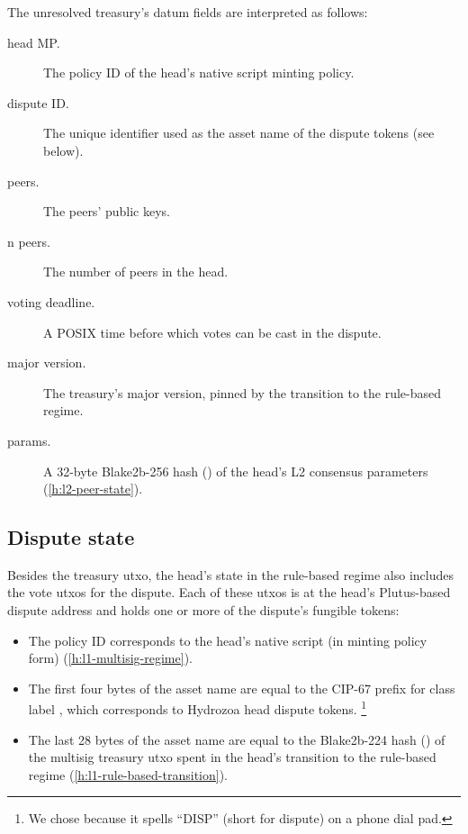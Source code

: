 \documentclass[../hydrozoa.tex]{subfiles}
\begin{document}
The unresolved treasury's datum fields are interpreted as follows:
\begin{description}
  \item[head MP.] The policy ID of the head's native script minting policy.
  \item[dispute ID.] The unique identifier used as the asset name of the dispute tokens (see below).
  \item[peers.] The peers' public keys.
  \item[n peers.] The number of peers in the head.
  \item[voting deadline.] A POSIX time before which votes can be cast in the dispute.
  \item[major version.] The treasury's major version, pinned by the transition to the rule-based regime.
  \item[params.] A 32-byte Blake2b-256 hash () of the head's L2 consensus parameters (\cref{h:l2-peer-state}).
\end{description}

\subsection{Dispute state}

Besides the treasury utxo, the head's state in the rule-based regime also includes the vote utxos for the dispute.
Each of these utxos is at the head's Plutus-based dispute address and holds one or more of the dispute's fungible tokens:
\begin{itemize}
  \item The policy ID corresponds to the head's native script (in minting policy form) (\cref{h:l1-multisig-regime}).
  \item The first four bytes of the asset name are equal to the CIP-67
    \citep{AlessandroKonradThomasVellekoopCIP67AssetName2022}
    prefix for class label \headDisputeToken{}, which corresponds to Hydrozoa head dispute tokens.%
    \footnote{We chose \headDisputeToken{} because it spells ``DISP'' (short for dispute) on a phone dial pad.}
  \item The last 28 bytes of the asset name are equal to the Blake2b-224 hash () of the multisig treasury utxo spent in the head's transition to the rule-based regime (\cref{h:l1-rule-based-transition}).
\end{itemize}
\end{document}
